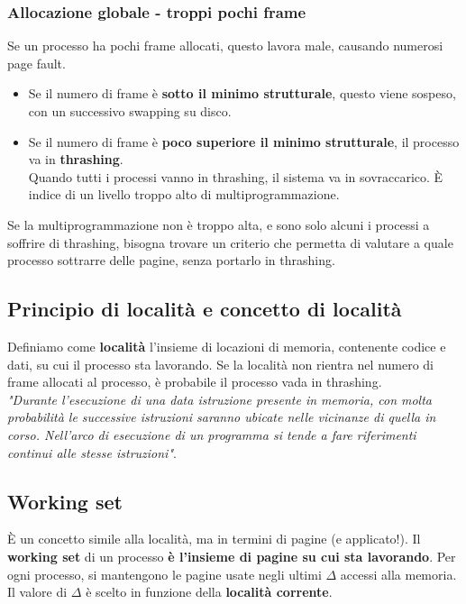\documentclass{report}
\begin{document}
\subsubsection{Allocazione globale - troppi pochi frame}
Se un processo ha pochi frame allocati, questo lavora male, causando numerosi page fault.
\begin{itemize}
    \item Se il numero di frame è \textbf{sotto il minimo strutturale}, questo viene sospeso, con un successivo swapping su disco.
    
    \item Se il numero di frame è \textbf{poco superiore il minimo strutturale}, il processo va in \textbf{thrashing}.\\
    Quando tutti i processi vanno in thrashing, il sistema va in sovraccarico. È indice di un livello troppo alto di multiprogrammazione.
\end{itemize}

Se la multiprogrammazione non è troppo alta, e sono solo alcuni i processi a soffrire di thrashing, bisogna trovare un criterio che permetta di valutare a quale processo sottrarre delle pagine, senza portarlo in thrashing.

\subsection{Principio di località e concetto di località}
Definiamo come \textbf{località} l'insieme di locazioni di memoria, contenente codice e dati, su cui il processo sta lavorando. Se la località non rientra nel numero di frame allocati al processo, è probabile il processo vada in thrashing.\\
\textit{"Durante l'esecuzione di una data istruzione presente in memoria, con molta probabilità le successive istruzioni saranno ubicate nelle vicinanze di quella in corso. Nell'arco di esecuzione di un programma si tende a fare riferimenti continui alle stesse istruzioni"}.

\newpage

\subsection{Working set}
È un concetto simile alla località, ma in termini di pagine (e applicato!). Il \textbf{working set} di un processo \textbf{è l'insieme di pagine su cui sta lavorando}.
Per ogni processo, si mantengono le pagine usate negli ultimi $\Delta$ accessi alla memoria. Il valore di $\Delta$ è scelto in funzione della \textbf{località corrente}.
\end{document}
